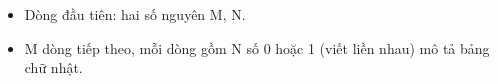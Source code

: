 \begin{itemize}
	\item     Dòng đầu tiên: hai số nguyên M, N.   
	\item     M dòng tiếp theo, mỗi dòng gồm N số 0 hoặc 1 (viết liền nhau) mô tả bảng chữ nhật.    


\end{itemize}

\